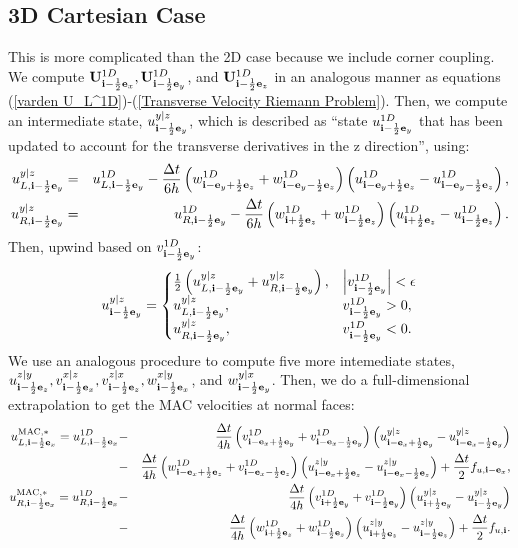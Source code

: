 \documentclass[11pt]{article}
\def\half  {\frac{1}{2}}
\def\dt    {\Delta t}
\def\mac   {\rm MAC}
\def\eb    {{\bf e}}
\def\ib    {{\bf i}}
\def\Ub    {{\bf U}}
\begin{document}
\subsection{3D Cartesian Case}
This is more complicated than the 2D case because we include corner coupling.  We compute $\Ub_{\ib-\half\eb_x}^{1D}, \Ub_{\ib-\half\eb_y}^{1D}$, and $\Ub_{\ib-\half\eb_z}^{1D}$ in an analogous manner as equations (\ref{varden U_L^1D})-(\ref{Transverse Velocity Riemann Problem}).  Then, we compute an intermediate state, $u_{\ib-\half\eb_y}^{y|z}$, which is described as ``state $u_{\ib-\half\eb_y}^{1D}$ that has been updated to account for the transverse derivatives in the z direction'', using:
\begin{eqnarray}
u_{L,\ib-\half\eb_y}^{y|z} &=& u_{L,\ib-\half\eb_y}^{1D} - \frac{\dt}{6h}\left(w_{\ib-\eb_y+\half\eb_z}^{1D}+w_{\ib-\eb_y-\half\eb_z}^{1D}\right)\left(u_{\ib-\eb_y+\half\eb_z}^{1D}-u_{\ib-\eb_y-\half\eb_z}^{1D}\right), \\
u_{R,\ib-\half\eb_y}^{y|z} &=& u_{R,\ib-\half\eb_y}^{1D} - \frac{\dt}{6h}\left(w_{\ib+\half\eb_z}^{1D}+w_{\ib-\half\eb_z}^{1D}\right)\left(u_{\ib+\half\eb_z}^{1D}-u_{\ib-\half\eb_z}^{1D}\right).
\end{eqnarray}
Then, upwind based on $v_{\ib-\half\eb_y}^{1D}$:
\begin{equation}
u_{\ib-\half\eb_y}^{y|z} =
\begin{cases}
\half\left(u_{L,\ib-\half\eb_y}^{y|z} + u_{R,\ib-\half\eb_y}^{y|z}\right), & \left|v_{\ib-\half\eb_y}^{1D}\right| < \epsilon \\
u_{L,\ib-\half\eb_y}^{y|z}, & v_{\ib-\half\eb_y}^{1D} > 0, \\
u_{R,\ib-\half\eb_y}^{y|z}, & v_{\ib-\half\eb_y}^{1D} < 0.
\end{cases}
\end{equation}
We use an analogous procedure to compute five more intemediate states, $u_{\ib-\half\eb_z}^{z|y}, v_{\ib-\half\eb_x}^{x|z}, v_{\ib-\half\eb_z}^{z|x}, w_{\ib-\half\eb_x}^{x|y}$, and $w_{\ib-\half\eb_y}^{y|x}$.  Then, we do a full-dimensional extrapolation to get the MAC velocities at normal faces:
\begin{eqnarray}
u_{L,\ib-\half\eb_x}^{\mac,*} = u_{L,\ib-\half\eb_x}^{1D} &-& \frac{\dt}{4h}\left(v_{\ib-\eb_x+\half\eb_y}^{1D}+v_{\ib-\eb_x-\half\eb_y}^{1D}\right)\left(u_{\ib-\eb_x+\half\eb_y}^{y|z}-u_{\ib-\eb_x-\half\eb_y}^{y|z}\right) \nonumber \\
&-& \frac{\dt}{4h}\left(w_{\ib-\eb_x+\half\eb_z}^{1D}+v_{\ib-\eb_x-\half\eb_z}^{1D}\right)\left(u_{\ib-\eb_x+\half\eb_z}^{z|y}-u_{\ib-\eb_x-\half\eb_z}^{z|y}\right) + \frac{\dt}{2}f_{u,\ib-\eb_x}, \\
u_{R,\ib-\half\eb_x}^{\mac,*} = u_{R,\ib-\half\eb_x}^{1D} &-& \frac{\dt}{4h}\left(v_{\ib+\half\eb_y}^{1D}+v_{\ib-\half\eb_y}^{1D}\right)\left(u_{\ib+\half\eb_y}^{y|z}-u_{\ib-\half\eb_y}^{y|z}\right) \nonumber \\
&-& \frac{\dt}{4h}\left(w_{\ib+\half\eb_z}^{1D}+w_{\ib-\half\eb_z}^{1D}\right)\left(u_{\ib+\half\eb_z}^{z|y}-u_{\ib-\half\eb_z}^{z|y}\right) + \frac{\dt}{2}f_{u,\ib}.
\end{eqnarray}
\end{document}
